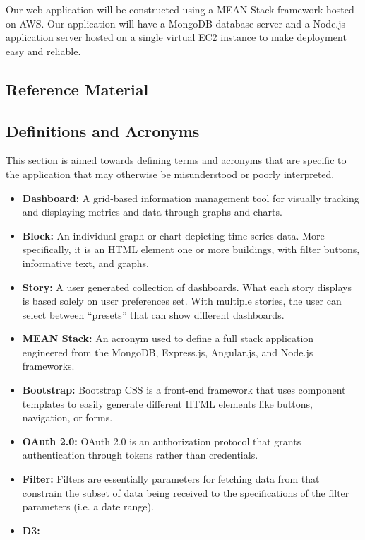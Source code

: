 \documentclass[journal,10pt,onecolumn,compsoc]{IEEEtran}
\begin{document}
    \noindent Our web application will be constructed using a MEAN Stack framework hosted on AWS. Our application will have a MongoDB database server and a Node.js application server hosted on a single virtual EC2 instance to make deployment easy and reliable.
   
    \subsection{Reference Material}
    \subsection{Definitions and Acronyms}
    This section is aimed towards defining terms and acronyms that are specific to the application that may otherwise be misunderstood or poorly interpreted.
    \begin{itemize}
        \item \textbf{Dashboard:}
            A grid-based information management tool for visually tracking and displaying metrics and data through graphs and charts.
        \item \textbf{Block:} 
            An individual graph or chart depicting time-series data. More specifically, it is an HTML element one or more buildings, with filter buttons, informative text, and graphs.
        \item \textbf{Story:} 
            A user generated collection of dashboards. What each story displays is based solely on user preferences set. With multiple stories, the user can select between ``presets'' that can show different dashboards.
        \item \textbf{MEAN Stack:} 
            An acronym used to define a full stack application engineered from the MongoDB, Express.js, Angular.js, and Node.js frameworks. 
        \item \textbf{Bootstrap:} 
            Bootstrap CSS is a front-end framework that uses component templates to easily generate different HTML elements like buttons, navigation, or forms. 
        \item \textbf{OAuth 2.0:} 
            OAuth 2.0 is an authorization protocol that grants authentication through tokens rather than credentials. 
        \item \textbf{Filter:} 
            Filters are essentially parameters for fetching data from that constrain the subset of data being received to the specifications of the filter parameters (i.e. a date range). 
        \item \textbf{D3:} 

\end{itemize}
\end{document}
